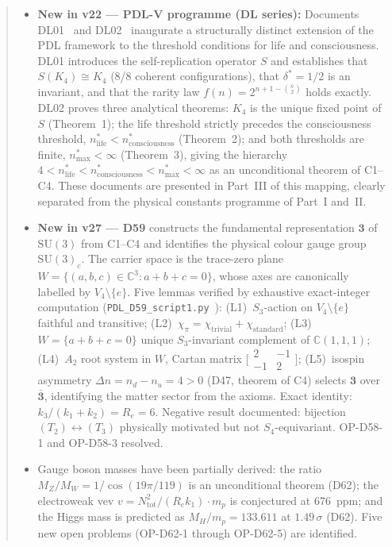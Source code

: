 \documentclass[11pt,a4paper]{article}
\theoremstyle{plain}
\theoremstyle{definition}
\theoremstyle{remark}
\begin{document}
\begin{abstract}
\begin{itemize}
\item \textbf{New in v22 --- PDL-V programme (DL series):} Documents DL01~\cite{DL01} and DL02~\cite{DL02} inaugurate a structurally distinct extension of the PDL framework to the threshold conditions for life and consciousness. DL01 introduces the self-replication operator $S$ and establishes that $S(K_4) \cong K_4$ (8/8 coherent configurations), that $\delta^* = 1/2$ is an invariant, and that the rarity law $f(n) = 2^{n+1-\binom{n}{2}}$ holds exactly. DL02 proves three analytical theorems: $K_4$ is the unique fixed point of $S$ (Theorem~1); the life threshold strictly precedes the consciousness threshold, $n^*_{\mathrm{life}} < n^*_{\mathrm{consciousness}}$ (Theorem~2); and both thresholds are finite, $n^*_{\mathrm{max}} < \infty$ (Theorem~3), giving the hierarchy $4 < n^*_{\mathrm{life}} < n^*_{\mathrm{consciousness}} < n^*_{\mathrm{max}} < \infty$ as an unconditional theorem of C1--C4. These documents are presented in Part~III of this mapping, clearly separated from the physical constants programme of Part~I and~II. 
\item \textbf{New in v27 --- D59} constructs the fundamental representation $\mathbf{3}$ of $\mathrm{SU}(3)$ from C1--C4 and identifies the physical colour gauge group $\mathrm{SU}(3)_c$. The carrier space is the trace-zero plane $W = \{(a,b,c)\in\mathbb{C}^3 : a+b+c=0\}$, whose axes are canonically labelled by $V_4\setminus\{e\}$. Five lemmas verified by exhaustive exact-integer computation (\texttt{PDL\_D59\_script1.py}~\cite{D59py}): (L1)~$S_3$-action on $V_4\setminus\{e\}$ faithful and transitive; (L2)~$\chi_\pi = \chi_{\mathrm{trivial}} + \chi_{\mathrm{standard}}$; (L3)~$W = \{a+b+c=0\}$ unique $S_3$-invariant complement of $\mathbb{C}(1,1,1)$; (L4)~$A_2$ root system in $W$, Cartan matrix $\bigl[\begin{smallmatrix}2&-1\\-1&2\end{smallmatrix}\bigr]$; (L5)~isospin asymmetry $\Delta n = n_d - n_u = 4 > 0$ (D47, theorem of C4) selects $\mathbf{3}$ over $\bar{\mathbf{3}}$, identifying the matter sector from the axioms. Exact identity: $k_3/(k_1+k_2) = R_e = 6$. Negative result documented: bijection $(T_2)\leftrightarrow(T_3)$ physically motivated but not $S_4$-equivariant. OP-D58-1 and OP-D58-3 resolved.
\item Gauge boson masses have been partially derived: the ratio $M_Z/M_W = 1/\cos(19\pi/119)$ is an unconditional theorem (D62); the electroweak vev $v = N_{\mathrm{tot}}^2/(R_e k_1)\cdot m_p$ is conjectured at 676~ppm; and the Higgs mass is predicted as $M_H/m_p = 133.611$ at $1.49\,\sigma$ (D62). Five new open problems (OP-D62-1 through OP-D62-5) are identified.

\end{itemize}
\end{abstract}
\end{document}
